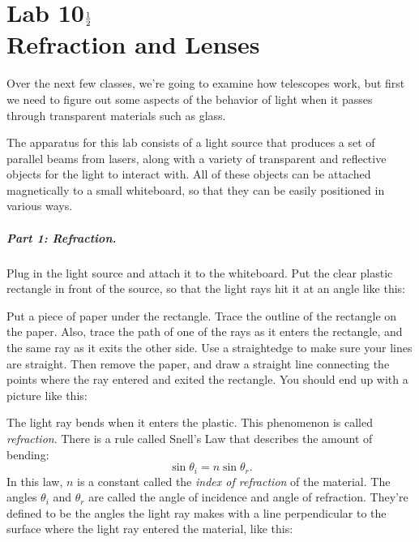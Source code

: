 \documentclass[twoside]{report}
\begin{document}
\chapter*{Lab 10$1\over 2$ \\ Refraction and Lenses}

Over the next few classes, we're going to examine how telescopes work,
but first we need to figure out some aspects of the behavior of light
when it passes through transparent materials such as glass.

The apparatus for this lab consists of a light source that produces a set
of parallel beams from lasers, along with a variety of transparent and
reflective objects for the light to interact with.  All of these objects
can be attached magnetically to a small whiteboard, so that they can be
easily positioned in various ways.

\paragraph{Part 1: Refraction.}
Plug in the light source and attach it to the whiteboard.  Put
the clear plastic rectangle in front of the source, so that
the light rays hit it at an angle like this:

\centerline{\epsfxsize 3in}



Put a piece of paper under the rectangle.  Trace the outline of the rectangle
on the paper.  Also, trace the path of one of the rays as it enters
the rectangle, and the same ray as it exits the other side.  Use
a straightedge to make sure your lines are straight.
Then remove the paper, and draw a straight line connecting the points
where the ray entered and exited the rectangle. 
You should end up
with a picture like this:

\centerline{\epsfxsize 3in}



The light ray bends when it enters the plastic.  This phenomenon is
called {\it refraction}.  There is a rule called Snell's Law that
describes the amount of bending:
$$
\sin\theta_i=n\sin\theta_r.
$$
In this law, $n$ is a constant called the {\it index of refraction} of 
the material.  The angles $\theta_i$ and $\theta_r$ are called the
angle of incidence and angle of refraction.  They're defined to be the
angles the light ray makes with a line perpendicular to the surface
where the light ray entered the material, like this:
\end{document}
